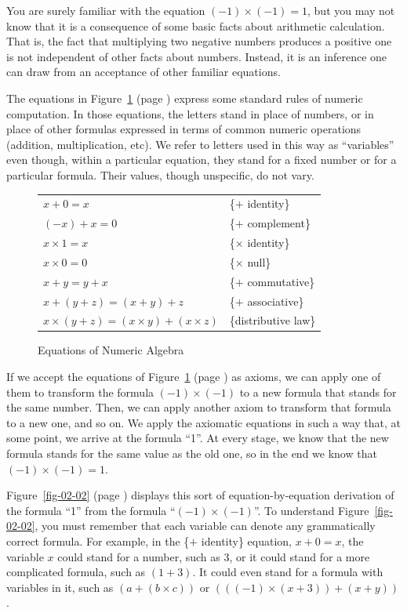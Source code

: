 You are surely familiar with the equation $(-1)\times(-1) = 1$, but you may
not know that it is a consequence of some basic facts about
arithmetic calculation. That is, the fact that multiplying two
negative numbers produces a positive one is not independent of
other facts about numbers. Instead, it is an inference one can draw
from an acceptance of other familiar equations.

The equations in Figure~\ref{fig-02-01} (page \pageref{fig-02-01})
express some standard rules of numeric computation. In those equations, the letters stand in
place of numbers, or in place of other
formulas expressed in terms of common numeric operations (addition,
multiplication, etc). We refer to letters used in this way as
``variables'' even though, within a particular equation, they
stand for a fixed number or for a particular formula.
Their values, though unspecific, do not vary.

\begin{figure}
\begin{center}
\begin{tabular}{ll}
$x+0 = x$                & \{$+$ identity\} \\
$(-x)+ x = 0$            & \{$+$ complement\} \\
$x \times 1 = x$         & \{$\times$ identity\} \\
$x \times 0 = 0$         & \{$\times$ null\} \\
$x+y = y+x$              & \{$+$ commutative\} \\
$x+(y+z) = (x+y)+z$      & \{$+$ associative\} \\
$x\times(y+z) = (x \times y)+(x \times z)$      & \{distributive law\} \\
\end{tabular}
\end{center}
\caption{Equations of Numeric Algebra}
\label{fig-02-01}
\end{figure}


If we accept the equations of Figure~\ref{fig-02-01} (page \pageref{fig-02-01}) as axioms,
we can apply one of them to transform the formula $(-1)\times(-1)$ to a new formula that
stands for the same number. Then, we can apply another axiom to
transform that formula to a new one, and so on. We apply the
axiomatic equations in such a way that, at some point, we
arrive at the formula ``1''. At every stage, we know that the
new formula stands for the same value as the old one, so in
the end we know that $(-1)\times(-1) = 1$.

Figure~\ref{fig-02-02} (page \pageref{fig-02-02}) displays this sort of equation-by-equation derivation of the
formula ``1'' from the formula ``$(-1)\times(-1)$''. To
understand Figure~\ref{fig-02-02}, you must remember that each
variable can denote any
grammatically correct formula. For example, in the
\{$+$ identity\} equation, $x + 0 = x$, the variable $x$ could stand for
a number, such as 3, or it could stand for a more complicated
formula, such as $(1 + 3)$. It could even stand for a formula
with variables in it, such as $(a + (b \times c))$ or
$(((-1) \times (x + 3)) + (x + y))$.

